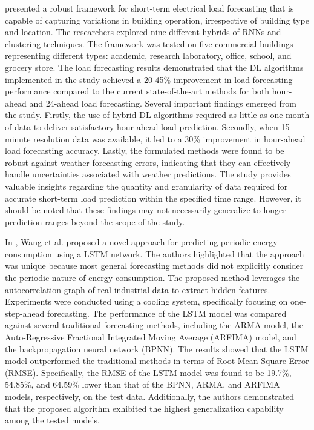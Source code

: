 \cite{CHITALIA2020115410} presented a robust framework for short-term electrical load forecasting that is capable of capturing variations in building operation, irrespective of building type and location.
The researchers explored nine different hybrids of RNNs and clustering techniques.
The framework was tested on five commercial buildings representing different types: academic, research laboratory, office, school, and grocery store.
The load forecasting results demonstrated that the DL algorithms implemented in the study achieved a 20-45\% improvement in load forecasting performance compared to the current state-of-the-art methods for both hour-ahead and 24-ahead load forecasting.
Several important findings emerged from the study.
Firstly, the use of hybrid DL algorithms required as little as one month of data to deliver satisfactory hour-ahead load prediction.
Secondly, when 15-minute resolution data was available, it led to a 30\% improvement in hour-ahead load forecasting accuracy.
Lastly, the formulated methods were found to be robust against weather forecasting errors, indicating that they can effectively handle uncertainties associated with weather predictions.
The study provides valuable insights regarding the quantity and granularity of data required for accurate short-term load prediction within the specified time range.
However, it should be noted that these findings may not necessarily generalize to longer prediction ranges beyond the scope of the study.

In \cite{WANG2020117197}, Wang et al. proposed a novel approach for predicting periodic energy consumption using a LSTM network.
The authors highlighted that the approach was unique because most general forecasting methods did not explicitly consider the periodic nature of energy consumption.
The proposed method leverages the autocorrelation graph of real industrial data to extract hidden features.
Experiments were conducted using a cooling system, specifically focusing on one-step-ahead forecasting.
The performance of the LSTM model was compared against several traditional forecasting methods, including the ARMA model, the Auto-Regressive Fractional Integrated Moving Average (ARFIMA) model, and the backpropagation neural network (BPNN).
The results showed that the LSTM model outperformed the traditional methods in terms of Root Mean Square Error (RMSE).
Specifically, the RMSE of the LSTM model was found to be 19.7\%, 54.85\%, and 64.59\% lower than that of the BPNN, ARMA, and ARFIMA models, respectively, on the test data.
Additionally, the authors demonstrated that the proposed algorithm exhibited the highest generalization capability among the tested models.

